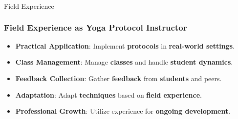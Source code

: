 \begin{frame}[fragile]\frametitle{}
\begin{center}
{\Large Field Experience }
\end{center}
\end{frame}

\begin{frame}[fragile]\frametitle{Field Experience as Yoga Protocol Instructor}

      \begin{itemize}
        \item \textbf{Practical Application}: Implement \textbf{protocols} in \textbf{real-world settings}.
        \item \textbf{Class Management}: Manage \textbf{classes} and handle \textbf{student dynamics}.
        \item \textbf{Feedback Collection}: Gather \textbf{feedback} from \textbf{students} and peers.
        \item \textbf{Adaptation}: Adapt \textbf{techniques} based on \textbf{field experience}.
        \item \textbf{Professional Growth}: Utilize experience for \textbf{ongoing development}.
      \end{itemize}

\end{frame}
